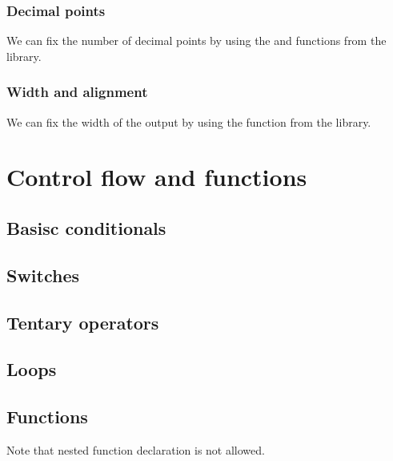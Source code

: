\documentclass{article}
\begin{document}
\subsubsection{Decimal points}
We can fix the number of decimal points by using the  and  functions from the  library.


\subsubsection{Width and alignment}
We can fix the width of the output by using the  function from the  library.



\section{Control flow and functions}
\subsection{Basisc conditionals}

\subsection{Switches}

\subsection{Tentary operators}

\subsection{Loops}


\subsection{Functions}

Note that nested function declaration is not allowed.
\end{document}
